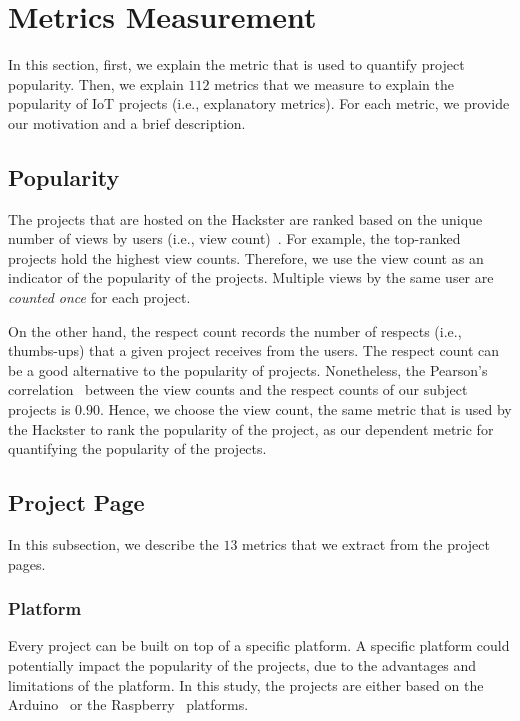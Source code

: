
\section{Metrics Measurement}\label{sec:measure}
\begin{comment}
\end{comment}

In this section, first, we explain the metric that is used to quantify project
popularity.  Then, we explain $112$ metrics that we measure to explain the
popularity of IoT projects (i.e., explanatory metrics).  For each metric, we
provide our motivation and a brief description.

\subsection{Popularity}

The projects that are hosted on the Hackster are ranked based on the unique number of views by users (i.e., view count)~\cite{hacksterpop}.
For example, the top-ranked projects hold the highest view counts.
Therefore, we use the view count as an indicator of the
popularity of the projects.
Multiple views by the same user are \textit{counted once} for each project.

On the other hand, the respect count records the number of respects (i.e., thumbs-ups) that a given project receives from the users.
The respect count can be a good alternative to the popularity of
projects.
Nonetheless, the Pearson's correlation~\cite{lawrence1989concordance} between the view counts and the respect counts of our subject projects is $0.90$.
Hence, we choose the view count, the same metric that is used by the Hackster to rank the popularity of the project, as our dependent metric for quantifying the popularity of the projects.

\subsection{Project Page}

In this subsection, we describe the $13$ metrics that we extract from the project pages.


\subsubsection*{Platform} Every project can be built on top of a specific platform.
A specific platform could potentially impact the popularity of the projects, due to the advantages and limitations of the platform.
In this study, the projects are either based on the Arduino~\cite{arduino} or the Raspberry~\cite{raspberrypi} platforms.

